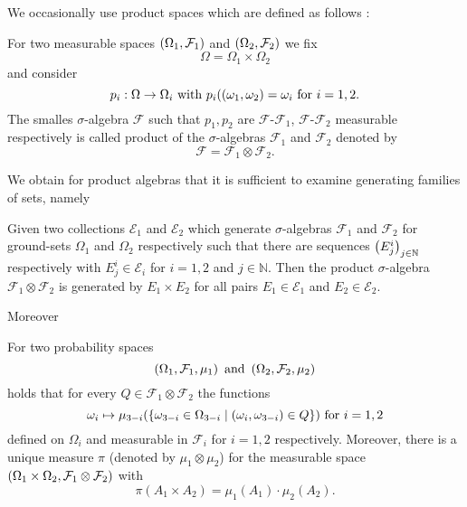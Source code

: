 We occasionally use product spaces which are defined as follows 
\cite[Chapter 22]{Bauer}:
\begin{definition}
  For two measurable spaces $\left(\Omega_{1}, \mathcal{F}_{1}\right)$ and 
  $\left(\Omega_{2}, \mathcal{F}_{2}\right)$ we fix
  \begin{equation*}
    \Omega = \Omega_{1}\times\Omega_{2}
  \end{equation*}
  and consider
  \begin{equation*}
    p_{i}:\Omega\rightarrow\Omega_{i}\text{ with }
      p_{i}(\left(\omega_{1}, \omega_{2}\right) = \omega_{i}\text{ for }i = 1,2.
  \end{equation*}
  The smalles $\sigma$-algebra $\mathcal{F}$ such that $p_{1}, p_{2}$ are 
  $\mathcal{F}$-$\mathcal{F_{1}}$, $\mathcal{F}$-$\mathcal{F_{2}}$ measurable 
  respectively is called product of the $\sigma$-algebras $\mathcal{F}_{1}$ and
  $\mathcal{F}_{2}$ denoted by
  \begin{equation*}
    \mathcal{F} = \mathcal{F}_{1}\otimes\mathcal{F}_{2}.
  \end{equation*}
\end{definition}
We obtain for product algebras that it is sufficient to examine generating
families of sets, namely
\begin{theorem}
  \cite[Theorem 22.1]{Bauer}
  Given two collections $\mathcal{E}_{1}$ and $\mathcal{E}_{2}$ which 
  generate $\sigma$-algebras $\mathcal{F}_{1}$ and $\mathcal{F}_{2}$ for 
  ground-sets $\Omega_{1}$ and $\Omega_{2}$ respectively such that there are
  sequences $\left(E^{i}_{j}\right)_{j\in\mathbb{N}}$ respectively with 
  $E^{i}_{j}\in\mathcal{E}_{i}$ for $i = 1,2$ and $j\in\mathbb{N}$. Then the
  product $\sigma$-algebra $\mathcal{F}_{1}\otimes\mathcal{F}_{2}$ is 
  generated by $E_{1}\times E_{2}$ for all pairs $E_{1}\in\mathcal{E}_{1}$ 
  and $E_{2}\in\mathcal{E}_{2}$. 
  \label{thm:productgen}
\end{theorem}
Moreover
\begin{lemma}
  \cite[Lemma 23.2, Theorem 23.3]{Bauer}
  For two probability spaces 
  \begin{equation*}
    \left(\Omega_{1}, \mathcal{F}_{1}, \mu_{1}\right)\text{ and }
    \left(\Omega_{2}, \mathcal{F}_{2}, \mu_{2}\right)
  \end{equation*}
  holds that for every $Q\in\mathcal{F}_{1}\otimes\mathcal{F}_{2}$ the 
  functions
  \begin{equation*}
    \omega_{i}\mapsto\mu_{3-i}(\left\{\omega_{3-i}\in\Omega_{3-i}\mid
      \left(\omega_{i}, \omega_{3-i}\right)\in Q\right\})
    \text{ for }i = 1,2
  \end{equation*}
  defined on $\Omega_{i}$ and measurable in $\mathcal{F}_{i}$ for $i = 1,2$
  respectively. Moreover, there is a unique measure $\pi$ (denoted by 
  $\mu_{1}\otimes\mu_{2}$) for the measurable space 
  $\left(\Omega_{1}\times\Omega_{2}, \mathcal{F}_{1}\otimes\mathcal{F}_{2}\right)$ 
  with 
  \begin{equation*}
    \pi(A_{1}\times A_{2}) = \mu_{1}(A_{1})\cdot\mu_{2}(A_{2}).
  \end{equation*}
\end{lemma} 
